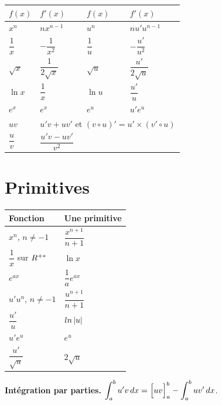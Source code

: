 \begin{center}
\setlength{\tabcolsep}{9pt}
\renewcommand{\arraystretch}{1.5}
\begin{tabular}{@{}llll@{}}
\toprule
$f(x)$ & $f'(x)$ & $f(x)$ & $f'(x)$ \\
\midrule
$x^{n}$ & $nx^{n-1}$ & $u^{n}$ & $nu'u^{n-1}$ \\
$\dfrac1x$ & $-\dfrac{1}{x^{2}}$ & $\dfrac1u$ & $-\dfrac{u'}{u^{2}}$ \\
$\sqrt x$ & $\dfrac{1}{2\sqrt x}$ & $\sqrt u$ & $\dfrac{u'}{2\sqrt u}$ \\
$\ln x$ & $\dfrac1x$ & $\ln u$ & $\dfrac{u'}{u}$ \\
$e^{x}$ & $e^{x}$ & $e^{u}$ & $u'e^{u}$ \\
$uv$ & \multicolumn{3}{l}{$u'v+uv'$ \qquad et
$\left(v \circ u\right)' = u' \times \left(v' \circ u\right)$} \\
$\dfrac uv$ & \multicolumn{3}{l}{$\dfrac{u'v-uv'}{v^{2}}$} \\
\bottomrule
\end{tabular}
\end{center}

\section*{Primitives}

\begin{center}
\setlength{\tabcolsep}{10pt}
\renewcommand{\arraystretch}{1.55}
\begin{tabular}{@{}ll@{}}
\toprule
Fonction & Une primitive \\
\midrule
$x^{n}$, $n \neq -1$ & $\dfrac{x^{n+1}}{n+1}$ \\
$\dfrac1x$ sur $R^{+*}$ & $\ln x$ \\
$e^{ax}$ & $\dfrac1a e^{ax}$ \\
$u'u^{n}$, $n \neq -1$ & $\dfrac{u^{n+1}}{n+1}$ \\
$\dfrac{u'}{u}$ & $ln\left|u\right|$ \\
$u'e^{u}$ & $e^{u}$ \\
$\dfrac{u'}{\sqrt u}$ & $2\sqrt u$ \\
\bottomrule
\end{tabular}
\end{center}

\noindent
\textbf{Intégration par parties.}
$\displaystyle\int_{a}^{b}u'v\,dx = \Bigl[uv\Bigr]_{a}^{b}
-\int_{a}^{b}uv'\,dx$.

